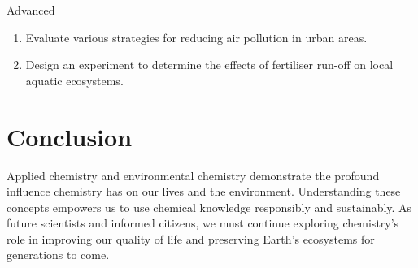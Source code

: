 \begin{tieredquestions}{Advanced}
\begin{enumerate}
\item Evaluate various strategies for reducing air pollution in urban areas.
\item Design an experiment to determine the effects of fertiliser run-off on local aquatic ecosystems.
\end{enumerate}
\end{tieredquestions}

\section{Conclusion}

Applied chemistry and environmental chemistry demonstrate the profound influence chemistry has on our lives and the environment. Understanding these concepts empowers us to use chemical knowledge responsibly and sustainably. As future scientists and informed citizens, we must continue exploring chemistry's role in improving our quality of life and preserving Earth's ecosystems for generations to come.